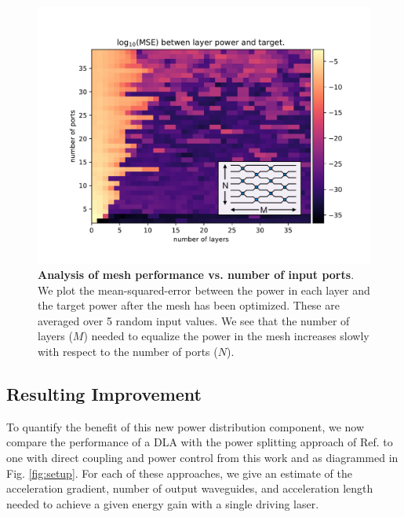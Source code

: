 \begin{figure}
\centering
\includegraphics[width=1\columnwidth]{figures/MZI_scale}
\caption{\label{fig:scaling} \textbf{Analysis of mesh performance vs. number of input ports}.  We plot the mean-squared-error between the power in each layer and the target power after the mesh has been optimized.  These are averaged over 5 random input values.  We see that the number of layers ($M$) needed to equalize the power in the mesh increases slowly with respect to the number of ports ($N$).}
\end{figure}

\subsection{\label{sec:DLA_analysis}Resulting Improvement}

To quantify the benefit of this new power distribution component, we now compare the performance of a DLA with the power splitting approach of Ref. \cite{hughes_-chip_2018} to one with direct coupling and power control from this work and as diagrammed in Fig. \ref{fig:setup}.  For each of these approaches, we give an estimate of the acceleration gradient, number of output waveguides, and acceleration length needed to achieve a given energy gain with a single driving laser.  

